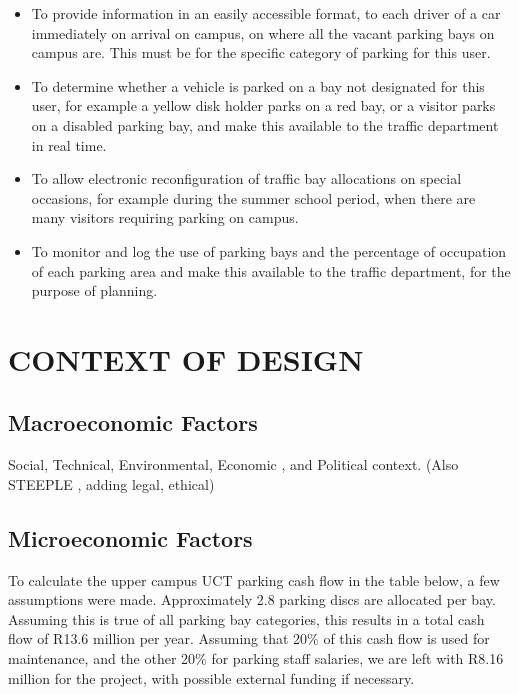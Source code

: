 \begin{itemize}
\item To provide information in an easily accessible format, to each driver of a car immediately on arrival on campus, on where all the vacant parking bays on campus are. This must be for the specific category of parking for this user.

\item To determine whether a vehicle is parked on a bay not designated for this user, for example a yellow disk holder parks on a red bay, or a visitor parks on a disabled parking bay, and make this available to the traffic department in real time.

\item To  allow electronic reconfiguration  of  traffic  bay allocations  on  special  occasions, for example during the summer school period, when there are many visitors requiring parking on campus.

\item To monitor and log the use of parking bays and the percentage of occupation of each parking area and make this available to the traffic department, for the purpose of planning.\cite{assignment}
\end{itemize}



\newpage
\section{CONTEXT OF DESIGN}
\subsection{Macroeconomic Factors}
Social, Technical, 
Environmental, Economic
, and Political context. 
(Also 
STEEPLE
, adding legal, ethical)
\subsection{Microeconomic Factors}
To calculate the upper campus UCT parking cash flow in the table below, a few assumptions were made. Approximately 2.8 parking discs are allocated per bay. Assuming this is true of all parking bay categories, this results in a total cash flow of R13.6 million per year. Assuming that 20\% of this cash flow is used for maintenance, and the other 20\% for parking staff salaries, we are left with R8.16 million for the project, with possible external funding if necessary.

